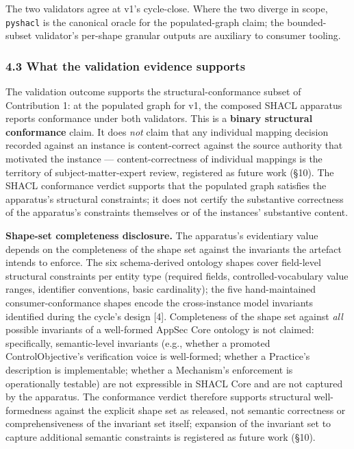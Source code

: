 \documentclass[
]{article}
\begin{document}
The two validators agree at v1's cycle-close. Where the two diverge in
scope, \texttt{pyshacl} is the canonical oracle for the populated-graph
claim; the bounded-subset validator's per-shape granular outputs are
auxiliary to consumer tooling.

\subsubsection{4.3 What the validation evidence
supports}\label{what-the-validation-evidence-supports}

The validation outcome supports the structural-conformance subset of
Contribution 1: at the populated graph for v1, the composed SHACL
apparatus reports conformance under both validators. This is a
\textbf{binary structural conformance} claim. It does \emph{not} claim
that any individual mapping decision recorded against an instance is
content-correct against the source authority that motivated the instance
--- content-correctness of individual mappings is the territory of
subject-matter-expert review, registered as future work (§10). The SHACL
conformance verdict supports that the populated graph satisfies the
apparatus's structural constraints; it does not certify the substantive
correctness of the apparatus's constraints themselves or of the
instances' substantive content.

\textbf{Shape-set completeness disclosure.} The apparatus's evidentiary
value depends on the completeness of the shape set against the
invariants the artefact intends to enforce. The six schema-derived
ontology shapes cover field-level structural constraints per entity type
(required fields, controlled-vocabulary value ranges, identifier
conventions, basic cardinality); the five hand-maintained
consumer-conformance shapes encode the cross-instance model invariants
identified during the cycle's design {[}4{]}. Completeness of the shape
set against \emph{all} possible invariants of a well-formed AppSec Core
ontology is not claimed: specifically, semantic-level invariants (e.g.,
whether a promoted ControlObjective's verification voice is well-formed;
whether a Practice's description is implementable; whether a Mechanism's
enforcement is operationally testable) are not expressible in SHACL Core
and are not captured by the apparatus. The conformance verdict therefore
supports structural well-formedness against the explicit shape set as
released, not semantic correctness or comprehensiveness of the invariant
set itself; expansion of the invariant set to capture additional
semantic constraints is registered as future work (§10).
\end{document}
